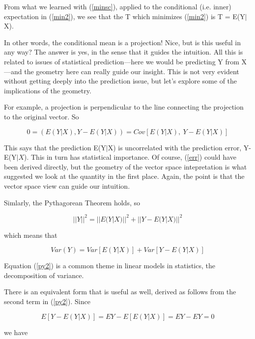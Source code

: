 From what we learned with (\ref{minsc}), applied to the conditional
(i.e. inner) expectation in (\ref{min2}), we see that the T which
minimizes (\ref{min2}) is T = E(Y$|$X).  

In other words, the conditional mean is a projection!  Nice, but is this
useful in any way?  The answer is yes, in the sense that it guides the
intuition.  All this is related to issues of statistical
prediction---here we would be predicting Y from X---and the geometry
here can really guide our insight.  This is not very evident without
getting deeply into the prediction issue, but let's explore some of the
implications of the geometry.

For example, a projection is perpendicular to the line connecting the
projection to the original vector.  So

\begin{equation}
\label{err}
0 = (E(Y|X),Y-E(Y|X)) 
= Cov[E(Y|X), ~ Y-E(Y|X)]
\end{equation}

This says that the prediction E(Y$|$X) is uncorrelated with the
prediction error, Y-E(Y$|X$).  This in turn has statistical importance.
Of course, (\ref{err}) could have been derived directly, but the
geometry of the vector space intepretation is what suggested we look at
the quantity in the first place.  Again, the point is that the vector
space view can guide our intuition.

Simlarly, the Pythagorean Theorem holds, so

\begin{equation}
\label{py}
{||Y||}^2 = {||E(Y|X)||}^2 + {||Y-E(Y|X)||}^2
\end{equation}

which means that

\begin{equation}
\label{py2}
Var(Y) = Var[E(Y|X)] + Var[Y-E(Y|X)]
\end{equation}

Equation (\ref{py2}) is a common theme in linear models in statistics,
the decomposition of variance.  

There is an equivalent form that is useful as well, derived as follows
from the second term in (\ref{py2}).  Since

\begin{equation}
E[Y-E(Y|X)] = EY - E[E(Y|X)] = EY - EY = 0
\end{equation}

we have

